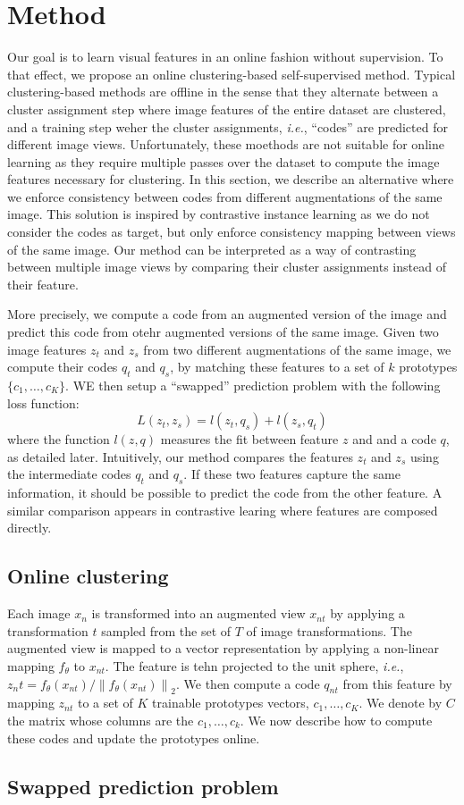 \documentclass[conference]{IEEEtran}
\begin{document}
\section{Method}
Our goal is to learn visual features in an online fashion without supervision. To that effect, we propose an online clustering-based self-supervised method.
Typical clustering-based methods are offline in the sense that they alternate between a cluster assignment step where image features of the entire dataset are clustered, and a training step weher the cluster assignments, 
\textit{i.e.}, ``codes'' are predicted for different image views. 
Unfortunately, these moethods are not suitable for online learning as they require multiple passes over the dataset to compute the image features necessary for clustering.
In this section, we describe an alternative where we enforce consistency between codes from different augmentations of the same image.
This solution is inspired by contrastive instance learning as we do not consider the codes as target, but only enforce consistency mapping between views of the same image.
Our method can be interpreted as a way of contrasting between multiple image views by comparing their cluster assignments instead of their feature.

More precisely, we compute a code from an augmented version of the image and predict this code from otehr augmented versions of the same image.
Given two image features $z_t$ and $z_s$ from two different augmentations of the same image, we compute their codes $q_t$ and $q_s$, by matching these features to a set of $k$ prototypes $\{c_1, \ldots, c_K\}$.
WE then setup a ``swapped'' prediction problem with the following loss function:
\begin{equation}
    L(z_t, z_s) = l(z_t, q_s)+l(z_s, q_t)
\end{equation}
where the function $l(z,q)$ measures the fit between feature $z$ and and a code $q$, as detailed later.
Intuitively, our method compares the features $z_t$ and $z_s$ using the intermediate codes $q_t$ and $q_s$. 
If these two features capture the same information, it should be possible to predict the code from the other feature.
A similar comparison appears in contrastive learing where features are composed directly.

\subsection{Online clustering}
Each image $x_n$ is transformed into an augmented view $x_{nt}$ by applying a transformation $t$ sampled from the set of $T$ of image transformations.
The augmented view is mapped to a vector representation by applying a non-linear mapping $f_\theta$ to $x_{nt}$.
The feature is tehn projected to the unit sphere, \textit{i.e.}, $z_nt = f_\theta (x_{nt})/ \left\lVert f_\theta(x_{nt})\right\rVert_2$.
We then compute a code $q_{nt}$ from this feature by mapping $z_{nt}$ to a set of $K$ trainable prototypes vectors, ${c_1, \ldots, c_K}$. 
We denote by $C$ the matrix whose columns are the $c_1, \ldots, c_k$. We now describe how to compute these codes and update the prototypes online.

\subsection{Swapped prediction problem}



\end{document}

